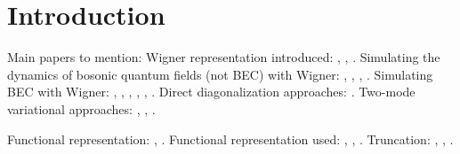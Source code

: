 \chapter{Introduction}

Main papers to mention:
Wigner representation introduced: \cite{Wigner1932}, \cite{Moyal1947}, \cite{Dirac1945}.
Simulating the dynamics of bosonic quantum fields (not BEC) with Wigner: \cite{Drummond1993}, \cite{Drummond1993a}, \cite{Corney2006}, \cite{Corney2008}.
Simulating BEC with Wigner: \cite{Steel1998}, \cite{Norrie2005}, \cite{Norrie2006}, \cite{Deuar2007}, \cite{Egorov2011}, \cite{Opanchuk2012}.
Direct diagonalization approaches: \cite{Sakmann2009}.
Two-mode variational approaches: \cite{Sinatra2011}, \cite{Li2008}, \cite{Li2009}.

Functional representation: \cite{Graham1970}, \cite{Graham1970a}.
Functional representation used: \cite{Steel1998}, \cite{Isella2006}, \cite{Norrie2006a}.
Truncation: \cite{Drummond1993}, \cite{Steel1998}, \cite{Sinatra2002}.
